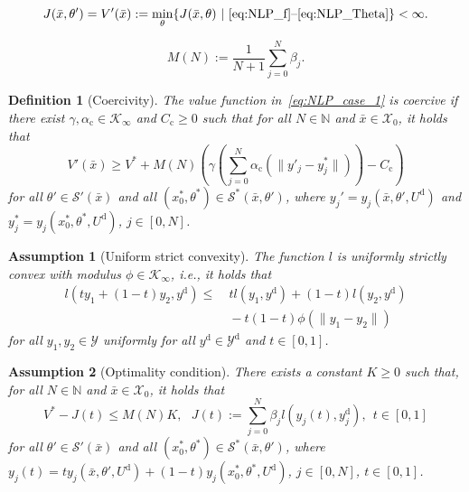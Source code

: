 \documentclass[10pt,a4paper]{amsart}
\newtheorem{defn}{Definition}
\newtheorem{ass}{Assumption}
\begin{document}
\begin{equation}\label{eq:NLP_case_1}
	J(\bar{x},\theta') = V'(\bar{x}) := \min_{\theta}\{ J(\bar{x},\theta)\ |\  \text{\eqref{eq:NLP_f}--\eqref{eq:NLP_Theta}}\} < \infty.
\end{equation}

\begin{equation}\label{eq:B_def}
	M(N):=\frac{1}{N+1}\sum_{j=0}^N\beta_j.
\end{equation}

\begin{defn}[Coercivity]\label{def:coerc}
	The value function in~\eqref{eq:NLP_case_1} is \emph{coercive} if there exist $\gamma,\alpha_\mathrm{c}\in\mathcal{K}_\infty$ and $C_\mathrm{c}\geq0$ such that for all $N\in\mathbb{N}$ and $\bar{x}\in\mathcal{X}_0$, it holds that
	\begin{equation}\label{eq:coerc}
		V'(\bar{x}) \geq V^* + M(N)\left(\gamma\left( \sum_{j=0}^{N} \alpha_\mathrm{c}(\|y'_j - y^*_j\|)\right) - C_\mathrm{c}\right)
	\end{equation}
	for all $\theta'\in\mathcal{S}'(\bar{x})$ and all $(x_0^*,\theta^*)\in \mathcal{S}^*(\bar{x},\theta')$, where $y_j' = y_j(\bar{x},\theta',U^\mathrm{d})$ and $y_j^* = y_j(x_0^*,\theta^*,U^\mathrm{d})$, $j\in[0,N]$.
\end{defn}

\begin{ass}[Uniform strict convexity]\label{ass:convex_lr}
	The function $l$ is uniformly strictly convex with modulus $\phi\in\mathcal{K}_\infty$, i.e., it holds that
	\begin{equation*}
		\begin{split}
			l(ty_1+(1-t)y_2,y^\mathrm{d})
			\leq&\ tl(y_1,y^\mathrm{d})+(1-t)l(y_2,y^\mathrm{d})\nonumber\\
			&\ -t(1-t)\phi(\|y_1-y_2\|)
		\end{split}
	\end{equation*}
	for all $y_1,y_2\in\mathcal{Y}$ uniformly for all $y^\mathrm{d}\in\mathcal{Y}^\mathrm{d}$ and $t\in[0,1]$.
\end{ass}

\begin{ass}[Optimality condition]\label{ass:optimality}
	There exists a constant $K\geq0$ such that, for all $N\in\mathbb{N}$ and $\bar{x}\in\mathcal{X}_0$, it holds that
	\begin{equation}\label{eq:cond_V_Jt}
		V^* - J(t) \leq M(N)K, \ \ \ J(t) := \sum_{j=0}^N\beta_jl(y_j(t),y^\mathrm{d}_j), \ \ t\in[0,1]
	\end{equation}
	for all $\theta'\in\mathcal{S}'(\bar{x})$ and all $(x_0^*,\theta^*)\in\mathcal{S}^*(\bar{x},\theta')$, where $y_j(t) = ty_j(\bar{x},\theta',U^\mathrm{d}) + (1-t)y_j(x_0^*,\theta^*,U^\mathrm{d})$, $j\in[0,N]$, $t\in[0,1]$.
\end{ass}
\end{document}
